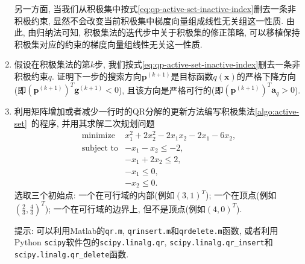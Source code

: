 \documentclass{SBCbookchapter}
\newcommand{\V}[1]{{\bm{#1}}}
\numberwithin{equation}{section}
\begin{document}
\begin{enumerate}
另一方面, 当我们从积极集中按式\eqref{eq:qp-active-set-inactive-index}删去一条非积极约束, 显然不会改变当前积极集中梯度向量组成线性无关组这一性质. 由此, 由归纳法可知, 积极集法的迭代步中关于积极集的修正策略, 可以移植保持积极集对应的约束的梯度向量组线性无关这一性质.

\item 假设在积极集法的第$k$步, 我们按式\eqref{eq:qp-active-set-inactive-index}删去一条非积极约束$q.$ 证明下一步的搜索方向$\V{p}^{(k+1)}$是目标函数$q(\V{x})$的严格下降方向(即$\left( \V{p}^{(k+1)} \right)^T \V{g}^{(k+1)} < 0$), 且该方向是严格可行的(即$\left( \V{p}^{(k+1)} \right)^T \V{a}_q > 0$).

\item 利用矩阵增加或者减少一行时的QR分解的更新方法编写积极集法\ref{algo:active-set}~的程序, 并用其求解二次规划问题
\begin{equation*}
\begin{array}{cl}
\text{minimize} & x_1^2 + 2x_2^2 -2x_1x_2 - 2x_1 - 6x_2, \\
\text{subject to} & -x_1 - x_2 \leqslant -2, \\
& -x_1 + 2x_2 \leqslant 2, \\
& -x_1 \leqslant 0,\\
& -x_2 \leqslant 0.
\end{array}
\end{equation*}
选取三个初始点: 一个在可行域的内部(例如$(3, 1)^T$); 一个在顶点(例如$(\frac{2}{3}, \frac{4}{3})^T$); 一个在可行域的边界上, 但不是顶点(例如$(4, 0)^T$).

提示: 可以利用Matlab的\texttt{qr.m}, \texttt{qrinsert.m}和\texttt{qrdelete.m}函数, 或者利用Python \texttt{scipy}软件包的\texttt{scipy.linalg.qr}, \texttt{scipy.linalg.qr\_insert}和\texttt{scipy.linalg.qr\_delete}函数.


\end{enumerate}




\end{document}
